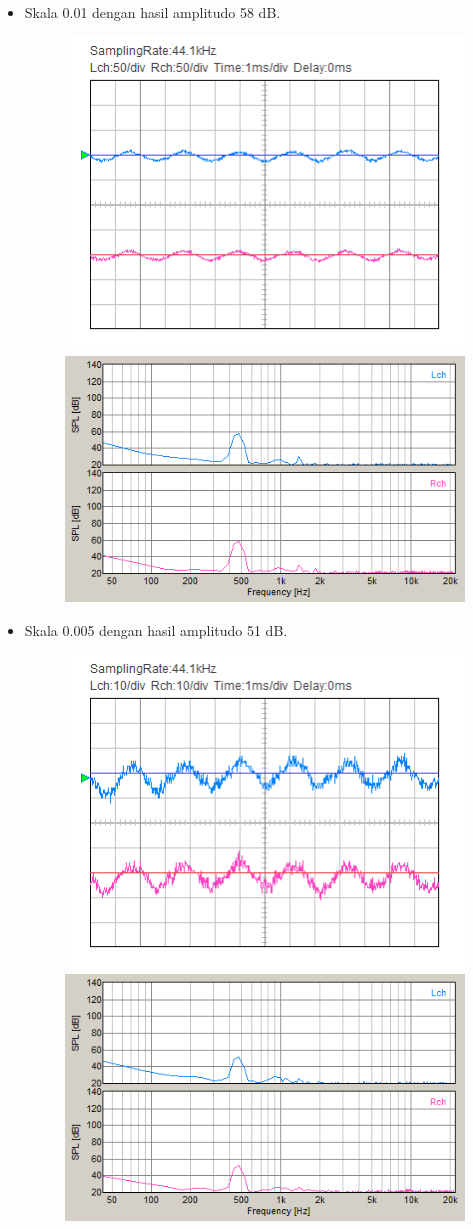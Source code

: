 \documentclass[12pt,]{article}
\begin{document}
\begin{itemize}
		\item Skala 0.01 dengan hasil amplitudo 58 dB.
		\begin{figure}[H]
			\centering
			\includegraphics[width=0.45\linewidth]{result/day_4/500Hz/tone001}
			\includegraphics[width=0.45\linewidth]{result/day_4/500Hz/fft_tone001}
		\end{figure}
	
		\newpage
		\item Skala 0.005 dengan hasil amplitudo 51 dB.
		\begin{figure}[H]
			\centering
			\includegraphics[width=0.45\linewidth]{result/day_4/500Hz/tone0005}
			\includegraphics[width=0.45\linewidth]{result/day_4/500Hz/fft_tone0005}
		\end{figure}
	

\end{itemize}
\end{document}
